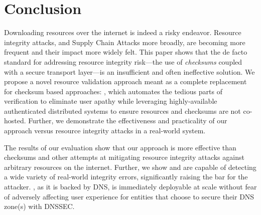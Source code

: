 \section{Conclusion} \label{sec:conclusion}

Downloading resources over the internet is indeed a risky endeavor. Resource
integrity attacks, and Supply Chain Attacks more broadly, are becoming more
frequent and their impact more widely felt. This paper shows that the de facto
standard for addressing resource integrity risk---the use of \emph{checksums}
coupled with a secure transport layer---is an insufficient and often ineffective
solution. We propose a novel resource validation approach meant as a complete
replacement for checksum based approaches: \SYSTEM{}, which automates the
tedious parts of verification to eliminate user apathy while leveraging
highly-available authenticated distributed systems to ensure resources and
checksums are not co-hosted. Further, we demonstrate the effectiveness and
practicality of our approach versus resource integrity attacks in a real-world
system.

The results of our evaluation show that our approach is more effective than
checksums and other attempts at mitigating resource integrity attacks against
arbitrary resources on the internet. Further, we show \DNSSYS{} and \DHTSYS{}
are capable of detecting a wide variety of real-world integrity errors,
significantly raising the bar for the attacker. \DNSSYS{}, as it is backed by
DNS, is immediately deployable at scale without fear of adversely affecting user
experience for entities that choose to secure their DNS zone(s) with DNSSEC.
